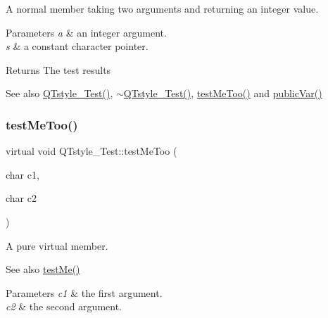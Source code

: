 A normal member taking two arguments and returning an integer value. 


\begin{DoxyParams}{Parameters}
{\em a} & an integer argument. \\
\hline
{\em s} & a constant character pointer. \\
\hline
\end{DoxyParams}
\begin{DoxyReturn}{Returns}
The test results 
\end{DoxyReturn}
\begin{DoxySeeAlso}{See also}
\mbox{\hyperlink{class_q_tstyle___test_a14a296ea4e2ad446712f2310bec60766}{Q\+Tstyle\+\_\+\+Test()}}, \mbox{\hyperlink{class_q_tstyle___test_a7e82397d534d9a867f0857da01a46e9e}{$\sim$\+Q\+Tstyle\+\_\+\+Test()}}, \mbox{\hyperlink{class_q_tstyle___test_ad5b201f097a720d44bf976c2f27efbda}{test\+Me\+Too()}} and \mbox{\hyperlink{class_q_tstyle___test_aabf7b2e9ed83ea44aca4d213baae06d3}{public\+Var()}} 
\end{DoxySeeAlso}
\mbox{\label{class_q_tstyle___test_ad5b201f097a720d44bf976c2f27efbda}} 
\subsubsection{\texorpdfstring{test\+Me\+Too()}{testMeToo()}}
{\footnotesize\ttfamily virtual void Q\+Tstyle\+\_\+\+Test\+::test\+Me\+Too (\begin{DoxyParamCaption}\item[{char}]{c1,  }\item[{char}]{c2 }\end{DoxyParamCaption})\hspace{0.3cm}{\ttfamily [pure virtual]}}



A pure virtual member. 

\begin{DoxySeeAlso}{See also}
\mbox{\hyperlink{class_q_tstyle___test_a8840748753118dd468e8368a28e49c62}{test\+Me()}} 
\end{DoxySeeAlso}

\begin{DoxyParams}{Parameters}
{\em c1} & the first argument. \\
\hline
{\em c2} & the second argument. \\
\hline
\end{DoxyParams}


